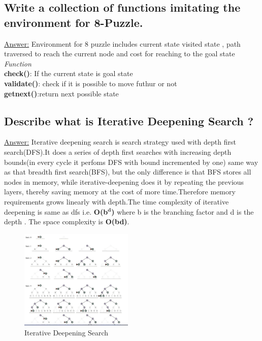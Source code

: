 \documentclass[15pt,journal]{IEEEtran}
\begin{document}

\subsection{Write a collection of functions imitating the environment for 8-Puzzle.}

\underline{Answer:}
Environment for 8 puzzle includes current state visited state , path traversed to reach the current node and cost for reaching to the goal state 
\emph{Function}\\
{\bf{check()}}: If the current state is goal state\\
{\bf{validate()}}: check if it is possible to move futhur or not\\
{\bf{getnext()}}:return next possible state\\


\subsection{Describe what is Iterative Deepening Search ?}

\underline{Answer:}
Iterative deepening search is search strategy used with depth first search(DFS).It does a series of depth first searches with increasing depth bounds(in every cycle it perfoms DFS with bound incremented by one)  same way as that breadth first search(BFS), but the only difference is that BFS stores all nodes in memory, while iterative-deepening does it by repeating the previous layers, thereby saving memory at the cost of more time.Therefore memory requirements grows linearly with depth.The time complexity of iterative deepening is same as dfs i.e. {\bf{O(b{{$\bm{^{d}}$)}}}} where b is the branching factor and d is the depth . The space complexity is {\bf{O(bd)}}.

\begin{figure}[H]%
\begin {center}
\includegraphics[width=0.48\textwidth]{images/ids.png}
\caption{Iterative Deepening Search} %
\label{fig:ecg}
\end {center}
\end{figure}
\end{document}
